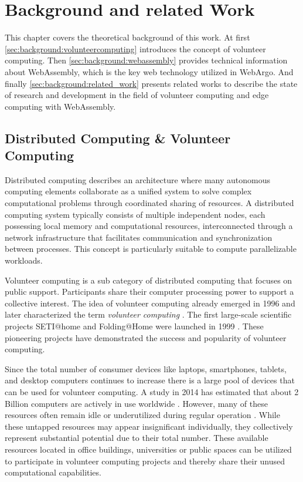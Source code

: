 \chapter{Background and related Work}
\label{ch:background}
This chapter covers the theoretical background of this work. At first \autoref{sec:background:volunteercomputing} introduces the concept of volunteer computing. Then \autoref{sec:background:webassembly} provides technical information about WebAssembly, which is the key web technology utilized in WebArgo. And finally \autoref{sec:background:related_work} presents related works to describe the state of research and development in the field of volunteer computing and edge computing with WebAssembly.

\section{Distributed Computing \& Volunteer Computing}
\label{sec:background:volunteercomputing}
Distributed computing describes an architecture where many autonomous computing elements collaborate as a unified system to solve complex computational problems through coordinated sharing of resources. A distributed computing system typically consists of multiple independent nodes, each possessing local memory and computational resources, interconnected through a network infrastructure that facilitates communication and synchronization between processes. This concept is particularly suitable to compute parallelizable workloads.

Volunteer computing is a sub category of distributed computing that focuses on public support. Participants share their computer processing power to support a collective interest. The idea of volunteer computing already emerged in 1996 \cite{relatedwork:boinc1} and \citeauthor{background:vcname} later characterized the term \emph{volunteer computing} \cite{background:vcname}. The first large-scale scientific projects SETI@home and Folding@Home were launched in 1999 \cite{relatedwork:boinc1,relatedwork:seti}. These pioneering projects have demonstrated the success and popularity of volunteer computing.

Since the total number of consumer devices like laptops, smartphones, tablets, and desktop computers continues to increase \cite{background:amountdeviceses,relatedwork:boinc1} there is a large pool of devices that can be used for volunteer computing. A study in 2014 has estimated that about 2 Billion computers are actively in use worldwide \cite{intro:computersAmount}. However, many of these resources often remain idle or underutilized during regular operation \cite{relatedwork:mobilecloud, relatedwork:wasmedgecomputing}. While these untapped resources may appear insignificant individually, they collectively represent substantial potential due to their total number. These available resources located in office buildings, universities or public spaces can be utilized to participate in volunteer computing projects and thereby share their unused computational capabilities.

